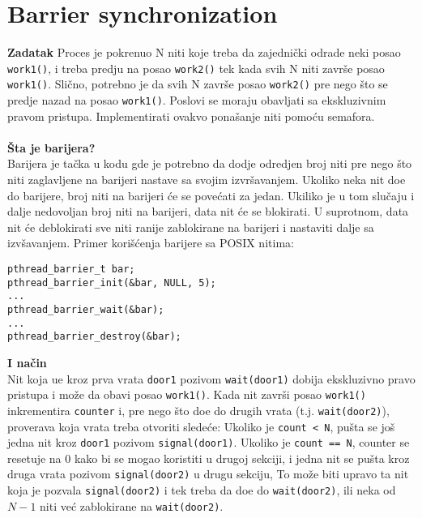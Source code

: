 \clearpage
\section{Barrier synchronization}
\textbf{\large Zadatak} Proces je pokrenuo $\mathrm N$ niti koje treba da zajedni\v{c}ki odrade neki posao \texttt{work1()}, i treba predju na posao \texttt{work2()} tek kada svih $\mathrm N$ niti zavr\v{s}e posao \texttt{work1()}. Sli\v{c}no, potrebno je da svih $\mathrm N$ zavr\v{s}e posao \texttt{work2()} pre nego \v{s}to se predje nazad na posao \texttt{work1()}. Poslovi se moraju obavljati sa ekskluzivnim pravom pristupa. Implementirati ovakvo pona\v{s}anje niti pomo\'{c}u semafora.
\\\\
\textbf{\v{S}ta je barijera?}
\\
Barijera je ta\v{c}ka u kodu gde je potrebno da dodje odredjen broj niti pre nego \v{s}to niti zaglavljene na barijeri nastave sa svojim izvr\v{s}avanjem. Ukoliko neka nit do\dj{}e do barijere, broj niti na barijeri \'{c}e se pove\'{c}ati za jedan. Ukiliko je u tom slu\v{c}aju i dalje nedovoljan broj niti na barijeri, data nit \'{c}e se blokirati. U suprotnom, data nit \'{c}e deblokirati sve niti ranije zablokirane na barijeri i nastaviti dalje sa izv\v{s}avanjem. Primer kori\v{s}\'{c}enja barijere sa POSIX nitima:
\begin{lstlisting}
pthread_barrier_t bar;
pthread_barrier_init(&bar, NULL, 5);
...
pthread_barrier_wait(&bar);
...
pthread_barrier_destroy(&bar);
\end{lstlisting}
\textbf{\large I na\v{c}in}\\
Nit koja u\dj{}e kroz prva vrata \texttt{door1} pozivom \texttt{wait(door1)} dobija ekskluzivno pravo pristupa i mo\v{z}e da obavi posao \texttt{work1()}. Kada nit zavr\v{s}i posao \texttt{work1()} inkrementira \texttt{counter} i, pre nego \v{s}to do\dj{}e do drugih vrata (t.j. \texttt{wait(door2)}), proverava koja vrata treba otvoriti slede\'{c}e: Ukoliko je \texttt{count < N}, pu\v{s}ta se jo\v{s} jedna nit kroz \texttt{door1} pozivom \texttt{signal(door1)}. Ukoliko je \texttt{count == N}, counter se resetuje na 0 kako bi se mogao koristiti u drugoj sekciji, i jedna nit se pu\v{s}ta kroz druga vrata pozivom \texttt{signal(door2)} u drugu sekciju, To mo\v{z}e biti upravo ta nit koja je pozvala \texttt{signal(door2)} i tek treba da do\dj{}e do \texttt{wait(door2)}, ili neka od $N-1$ niti ve\'{c} zablokirane na \texttt{wait(door2)}.
